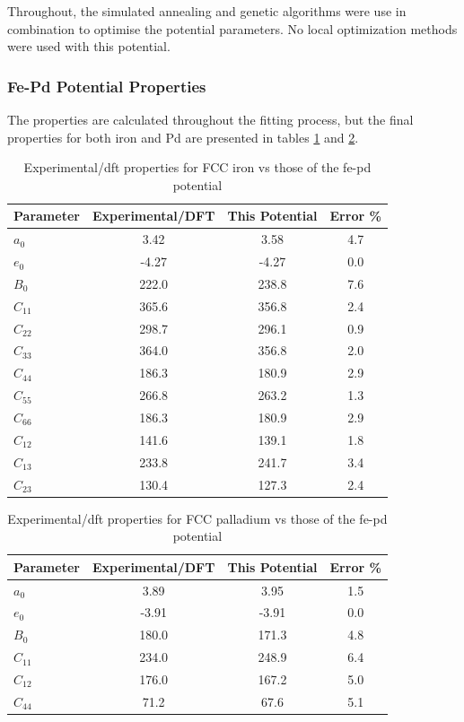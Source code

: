 Throughout, the simulated annealing and genetic algorithms were use in combination to optimise the potential parameters.  No local optimization methods were used with this potential.


\subsubsection{Fe-Pd Potential Properties}

The properties are calculated throughout the fitting process, but the final properties for both iron and Pd are presented in tables \ref{table:ironpotcalc} and \ref{table:palladiumpotcalc}.

\begin{table}[ht]
\renewcommand{\arraystretch}{1.2}
\begin{tabular}{lccc}
\hline\hline
Parameter & Experimental/DFT & This Potential & Error \%\\
\hline\hline
$a_0$ & 3.42   &  3.58  & 4.7\\
$e_0$ & -4.27  & -4.27 & 0.0 \\
$B_0$ & 222.0  &  238.8 & 7.6 \\
$C_{11}$ & 365.6  &  356.8 & 2.4 \\
$C_{22}$ & 298.7  &  296.1 & 0.9\\
$C_{33}$ & 364.0  &  356.8 & 2.0\\
$C_{44}$ & 186.3  &  180.9 & 2.9 \\
$C_{55}$ & 266.8  &  263.2 & 1.3 \\
$C_{66}$ & 186.3  &  180.9 & 2.9\\
$C_{12}$ & 141.6  &  139.1 & 1.8\\
$C_{13}$ & 233.8  &  241.7 & 3.4 \\
$C_{23}$ & 130.4  &  127.3 & 2.4 \\
\hline\hline
\end{tabular}
\caption{Experimental/dft properties for FCC iron vs those of the fe-pd potential}
\label{table:ironpotcalc}
\end{table}

\begin{table}[ht]
\renewcommand{\arraystretch}{1.2}
\begin{tabular}{lccc}
\hline\hline
Parameter & Experimental/DFT & This Potential & Error \%\\
\hline\hline
$a_0$ & 3.89 & 3.95  & 1.5\\
$e_0$ & -3.91  & -3.91  & 0.0 \\
$B_0$ & 180.0  & 171.3 & 4.8 \\
$C_{11}$ & 234.0  & 248.9 & 6.4 \\
$C_{12}$ & 176.0  & 167.2 & 5.0 \\
$C_{44}$ & 71.2  & 67.6 & 5.1 \\
\hline\hline
\end{tabular}
\caption{Experimental/dft properties for FCC palladium vs those of the fe-pd potential}
\label{table:palladiumpotcalc}
\end{table}

